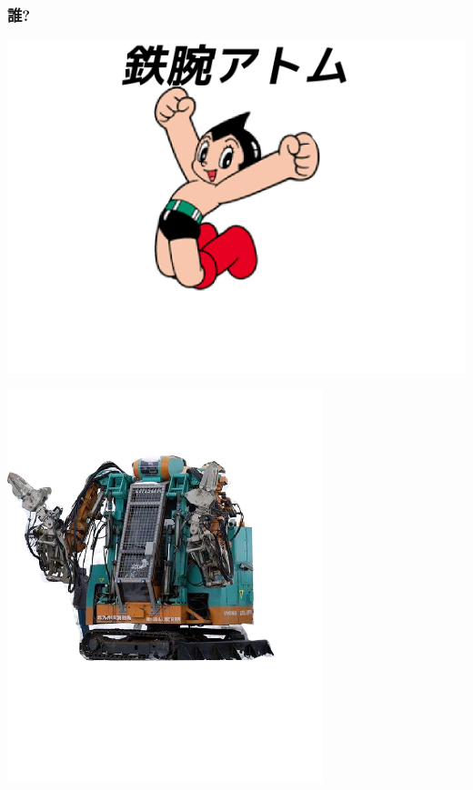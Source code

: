 \subsubsection{誰?}
\label{sec-4-1-1}

\begin{container-fluid}
\begin{row-fluid}
\begin{span6}
\includegraphics{img/astro/2.png}
\end{span6}
\begin{span6}
\includegraphics{img/rescue/1.png}
\end{span6}
\end{row-fluid}
\end{container-fluid}

